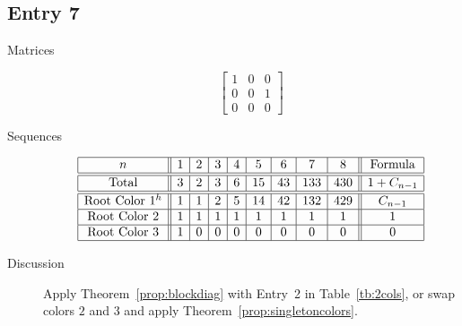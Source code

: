 \documentclass[12pt]{amsart}
\begin{document}
\subsection*{Entry 7}
\begin{description}
    \item[Matrices]
    
    \[\begin{bmatrix}
1 & 0 & 0 \\
0 & 0 & 1 \\
0 & 0 & 0
\end{bmatrix}\]
    \item[Sequences]\hspace*{\fill}\vspace{-0.5cm}
    \begin{center}
        \[
        \begin{array}{|c||c|c|c|c|c|c|c|c||c|}\hline
           n  & 1 & 2 & 3 & 4 & 5 & 6 & 7 & 8  & \text{Formula}\\\hline\hline
           \text{Total}  & 3 & 2 & 3 & 6 & 15 & 43 & 133 & 430 & 1+C_{n-1}\\\hline\hline
           \text{Root Color }1^h & 1 & 1 & 2 & 5 & 14 & 42 & 132 & 429 & C_{n-1}\\\hline
           \text{Root Color }2 & 1 & 1 & 1 & 1 & 1 & 1 & 1 & 1 & 1\\\hline
           \text{Root Color }3 & 1 & 0 & 0 & 0 & 0 & 0 & 0 & 0 & 0\\\hline
        \end{array}
        \]
    \end{center}
    \item[Discussion] Apply Theorem~\ref{prop:blockdiag} with Entry~2 in Table~\ref{tb:2cols}, or swap colors $2$ and $3$ and apply Theorem~\ref{prop:singletoncolors}.
    

    
\end{description}
\end{document}
